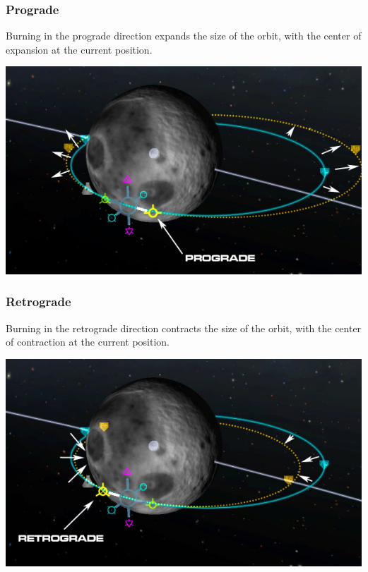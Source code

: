 {\begin{frame}
\begin{block}{}
\begin{center}
        \end{center}
    \end{block}
\end{frame}
}

\begin{frame}
    \frametitle{Prograde}
    \begin{block}{}
        Burning in the prograde direction expands the size of the orbit, with the center of expansion at the current
        position.
    \end{block}
    \begin{center}
        \includegraphics[scale=0.4]{images/prograde}
    \end{center}
\end{frame}
\begin{frame}
    \frametitle{Retrograde}
    \begin{block}{}
        Burning in the retrograde direction contracts the size of the orbit, with the center of contraction at the
        current position.
    \end{block}
    \begin{center}
        \includegraphics[scale=0.5]{images/retrograde}
    \end{center}
\end{frame}
